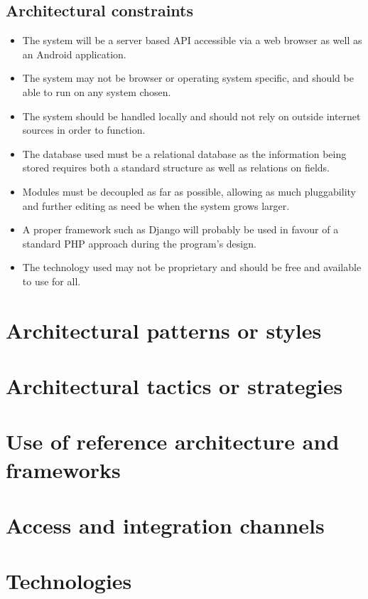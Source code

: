 \documentclass{article}
\begin{document}
	\subsection{Architectural constraints}\label{subsec:constraints}
		\begin{itemize}
			\item The system will be a server based API accessible via a web browser as well as an Android application.
			\item The system may not be browser or operating system specific, and should be able to run on any system chosen.
			\item The system should be handled locally and should not rely on outside internet sources in order to function.
			\item The database used must be a relational database as the information being stored requires both a standard structure as well as relations on fields.
			\item Modules must be decoupled as far as possible, allowing as much pluggability and further editing as need be when the system grows larger.
			\item A proper framework such as Django will probably be used in favour of a standard PHP approach during the program's design.
			\item The technology used may not be proprietary and should be free and available to use for all.
		\end{itemize}
	
	\cleardoublepage	
	\section{Architectural patterns or styles}\label{sec:patterns}
	
	\cleardoublepage
	\section{Architectural tactics or strategies}\label{sec:tactics}

	
	\cleardoublepage
	\section{Use of reference architecture and frameworks}\label{sec:reference}

	\cleardoublepage
	\section{Access and integration channels}\label{sec:access}
	
	\cleardoublepage
	\section{Technologies}\label{sec:technologies}

	
\end{document}
